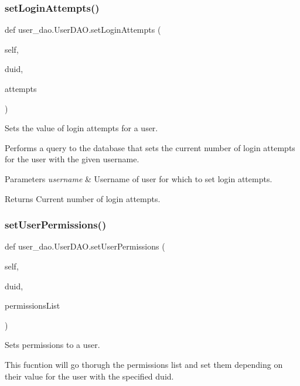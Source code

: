 \subsubsection{\texorpdfstring{set\+Login\+Attempts()}{setLoginAttempts()}}
{\footnotesize\ttfamily def user\+\_\+dao.\+User\+D\+A\+O.\+set\+Login\+Attempts (\begin{DoxyParamCaption}\item[{}]{self,  }\item[{}]{duid,  }\item[{}]{attempts }\end{DoxyParamCaption})}



Sets the value of login attempts for a user. 

Performs a query to the database that sets the current number of login attempts for the user with the given username.


\begin{DoxyParams}{Parameters}
{\em username} & Username of user for which to set login attempts.\\
\hline
\end{DoxyParams}
\begin{DoxyReturn}{Returns}
Current number of login attempts. 
\end{DoxyReturn}
\mbox{\label{classuser__dao_1_1_user_d_a_o_a6492941e2e4292a808bdcbfa9c450d20}} 
\subsubsection{\texorpdfstring{set\+User\+Permissions()}{setUserPermissions()}}
{\footnotesize\ttfamily def user\+\_\+dao.\+User\+D\+A\+O.\+set\+User\+Permissions (\begin{DoxyParamCaption}\item[{}]{self,  }\item[{}]{duid,  }\item[{}]{permissions\+List }\end{DoxyParamCaption})}



Sets permissions to a user. 

This fucntion will go thorugh the permissions list and set them depending on their value for the user with the specified duid.


